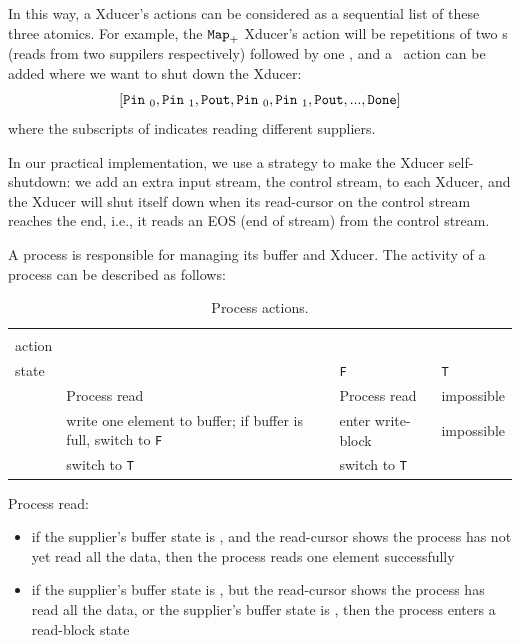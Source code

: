 In this way, a Xducer's actions can be considered as a sequential list of these three atomics.
For example,  the $\mathtt{Map}_{+}$ Xducer's action will be repetitions of two \pin s (reads from two suppilers respectively) followed by one \pout, and 
a \done \ action can be added where we want to shut down the Xducer: 
$$[\texttt{Pin} \ _0, \texttt{Pin} \ _1, \texttt{Pout}, \texttt{Pin} \ _0, \texttt{Pin} \ _1, \texttt{Pout},... ,\texttt{Done}]$$
 where the subscripts of \pin indicates reading different suppliers.

In our practical implementation, we use a strategy to make the Xducer self-shutdown: we add an extra input stream, the control stream, to each Xducer,
and the Xducer will shut itself down when its read-cursor on the control stream reaches the end, i.e., it reads an EOS (end of stream) from the control stream.


A process is responsible for managing its buffer and Xducer. 
The activity of a process can be described as follows:


 \begin{table}[H]\large
 	\centering
 	\begin{tabular}{|l|p{}|p{}|l|}  
 		\hline
 		 \diagbox{Xducer \\ action}{Buffer \\ state} & \filling & \draining \texttt{F} & \draining \texttt{T} \\ \hline
 		\pin  & Process read  &  Process read  & impossible \\
 		\hline
 		\pout &  write one element to buffer;
 		if buffer is full, switch to \draining \texttt{F}    &    enter write-block     & impossible \\ 
 		\hline
 		\done &  switch to \draining \texttt{T}      & switch to \draining \texttt{T}   & \skip  \\ 
 		\hline
 	\end{tabular}
 \caption{Process actions. }
 \end{table}

Process read:

\begin{itemize}
	\item if the supplier's buffer state is \draining, and the read-cursor shows the process has not yet read all the data, then the process reads one element successfully
	\item if the supplier's buffer state is \draining, but the read-cursor shows the process has read all the data, or the supplier's buffer state is \filling, then the process enters a read-block state
\end{itemize}

